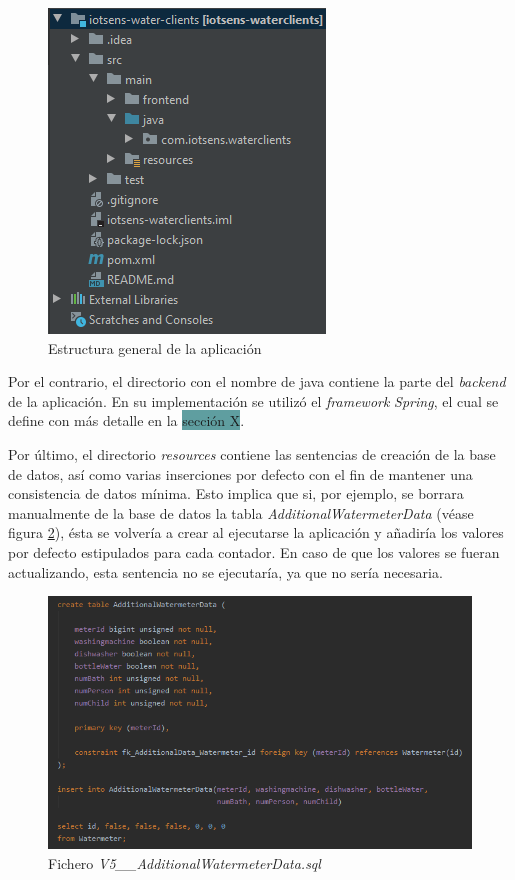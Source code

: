 \documentclass[pdftex,11pt,a4paper]{book}
\begin{document}
 \begin{figure}[h]
 \centering
 \includegraphics {images/implementacion/estructura-general.png}
 \caption{Estructura general de la aplicación} \label{fig:estructura-general}
 \end{figure}
 
 
Por el contrario, el directorio con el nombre de java contiene la parte del \textit{backend} de la aplicación. En su implementación se utilizó el \textit{framework} \textit{Spring}, el cual se define con más detalle en la \colorbox{CadetBlue}{sección X}.

Por último, el directorio \textit{resources} contiene las sentencias de creación de la base de datos, así como varias inserciones por defecto con el fin de mantener una consistencia de datos mínima. Esto implica que si, por ejemplo, se borrara manualmente de la base de datos la tabla \textit{AdditionalWatermeterData} (véase figura \ref{fig:AdditionalWatermeterData.sql}), ésta se volvería a crear al ejecutarse la aplicación y añadiría los valores por defecto estipulados para cada contador. En caso de que los valores se fueran actualizando, esta sentencia no se ejecutaría, ya que no sería necesaria.

 \begin{figure}[h]
 \centering
 \includegraphics [scale=0.85] {images/implementacion/sentencia-sql.png}
 \caption{Fichero \textit{V5\_\_AdditionalWatermeterData.sql}} \label{fig:AdditionalWatermeterData.sql}
 \end{figure}
\end{document}
